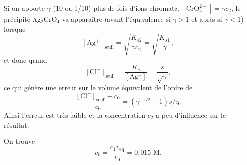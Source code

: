 \begin{solution}
\begin{questions}
    \question Si on apporte $\gamma$ (10 ou 1/10) plus de fois d’ions chromate, $\mathrm{[CrO_4^{2-}]} = \gamma c_2$, le précipité Ag$_2$CrO$_4$ va apparaître (avant l'équivalence si $\gamma > 1$ et après si $\gamma < 1$) lorsque
    $$\mathrm{[Ag^+]}_\text{seuil} = \sqrt{\dfrac{K_{s2}}{\gamma c_2}} = \sqrt{\dfrac{K_{s1}}{\gamma}},$$
    et donc quand
    $$\mathrm{[Cl^-]}_\text{seuil} = \dfrac{K_s}{\mathrm{[Ag^+]}} = \dfrac{s}{\sqrt{\gamma}},$$
    ce qui génère une erreur sur le volume équivalent de l'ordre de
    $$\dfrac{\mathrm{[Cl^-]}_\text{seuil} - c_0}{c_0} = (\gamma^{-1/2} - 1)s/c_0$$
    Ainsi l'erreur est très faible et la concentration $c_2$ a peu d'influence sur le résultat.
    
    \question On trouve
    $$c_0 = \dfrac{c_1 v_\text{eq}}{v_0} = 0,015 \text{ M}.$$

\end{questions}
\end{solution}